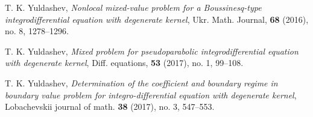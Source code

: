 ﻿\documentclass[
11pt,%
tightenlines,%
twoside,%
onecolumn,%
nofloats,%
nobibnotes,%
nofootinbib,%
superscriptaddress,%
noshowpacs,%
centertags]%
{revtex4}
\begin{document}
\begin{thebibliography}{20}
 T. K. Yuldashev, {\it Nonlocal mixed-value problem for a Boussinesq-type integrodifferential equation with degenerate kernel}, Ukr. Math. Journal, {\bf 68} (2016), no. 8, 1278--1296.

 T. K. Yuldashev, {\it Mixed problem for pseudoparabolic integrodifferential equation with degenerate kernel}, Diff. equations, {\bf 53} (2017), no. 1,  99--108. 

 T. K. Yuldashev, {\it Determination of the coefficient and boundary regime in boundary value problem for integro-differential equation with degenerate kernel}, Lobachevskii journal of math.  {\bf 38} (2017), no. 3,   547--553.

 

\end{thebibliography}
\end{document}
